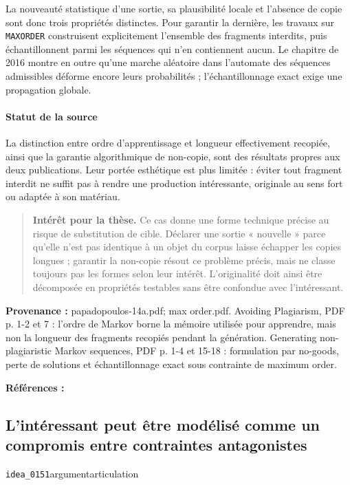 \documentclass[10pt,a4paper]{article}
\begin{document}
La nouveauté statistique d'une sortie, sa plausibilité locale et l'absence de copie sont donc trois propriétés distinctes. Pour garantir la dernière, les travaux sur \texttt{MAXORDER} construisent explicitement l'ensemble des fragments interdits, puis échantillonnent parmi les séquences qui n'en contiennent aucun. Le chapitre de 2016 montre en outre qu'une marche aléatoire dans l'automate des séquences admissibles déforme encore leurs probabilités ; l'échantillonnage exact exige une propagation globale.

\paragraph{Statut de la source}
La distinction entre ordre d'apprentissage et longueur effectivement recopiée, ainsi que la garantie algorithmique de non-copie, sont des résultats propres aux deux publications. Leur portée esthétique est plus limitée : éviter tout fragment interdit ne suffit pas à rendre une production intéressante, originale au sens fort ou adaptée à son matériau.

\begin{quote}
\textbf{Intérêt pour la thèse.} Ce cas donne une forme technique précise au risque de substitution de cible. Déclarer une sortie « nouvelle » parce qu'elle n'est pas identique à un objet du corpus laisse échapper les copies longues ; garantir la non-copie résout ce problème précis, mais ne classe toujours pas les formes selon leur intérêt. L'originalité doit ainsi être décomposée en propriétés testables sans être confondue avec l'intéressant.
\end{quote}
{\footnotesize\color{metadata}\textbf{Provenance :} papadopoulos-14a.pdf; max order.pdf. Avoiding Plagiarism, PDF p. 1-2 et 7 : l'ordre de Markov borne la mémoire utilisée pour apprendre, mais non la longueur des fragments recopiés pendant la génération. Generating non-plagiaristic Markov sequences, PDF p. 1-4 et 15-18 : formulation par no-goods, perte de solutions et échantillonnage exact sous contrainte de maximum order.\par}
{\footnotesize\color{metadata}\textbf{Références :} \parencite{papadopoulos2014avoiding,papadopoulos2016nonplagiaristic}\par}

\subsection{L'intéressant peut être modélisé comme un compromis entre contraintes antagonistes}
{\small\color{metadata} \texttt{idea\_0151}\quad\textbullet\quad argument\quad\textbullet\quad articulation\par}
\end{document}
